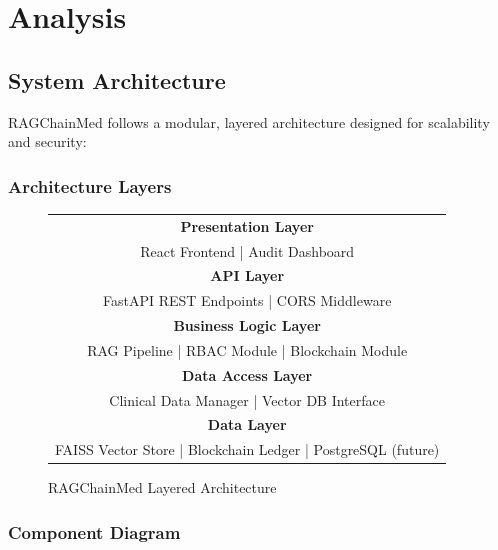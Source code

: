\documentclass[12pt,singleside,a4paper]{article}
\begin{document}
\pagebreak

\section{Analysis}

\subsection{System Architecture}

RAGChainMed follows a modular, layered architecture designed for scalability and security:

\subsubsection{Architecture Layers}

\begin{figure}[H]
\centering
\begin{tabular}{|c|}
\hline
\textbf{Presentation Layer} \\
React Frontend | Audit Dashboard \\
\hline
\textbf{API Layer} \\
FastAPI REST Endpoints | CORS Middleware \\
\hline
\textbf{Business Logic Layer} \\
RAG Pipeline | RBAC Module | Blockchain Module \\
\hline
\textbf{Data Access Layer} \\
Clinical Data Manager | Vector DB Interface \\
\hline
\textbf{Data Layer} \\
FAISS Vector Store | Blockchain Ledger | PostgreSQL (future) \\
\hline
\end{tabular}
\caption{RAGChainMed Layered Architecture}
\end{figure}

\subsubsection{Component Diagram}
\end{document}
